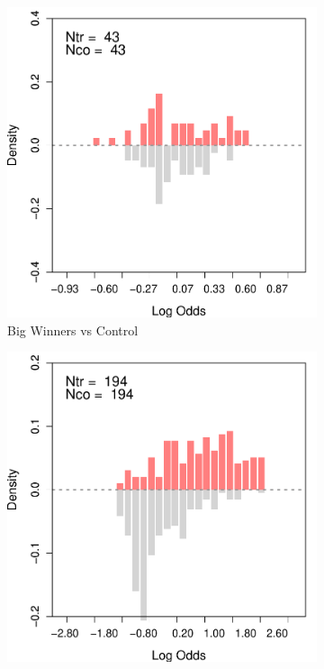 \documentclass[letterpaper,12pt,leqno]{article}
\begin{document}
\begin{figure}[!ht]
    \caption{Assessing Overlaps on Trimmed IRS Data}\label{fig:irs.overlap2}
    \centering
    \begin{minipage}[c]{.8\linewidth}
        \centering
        \hspace{-2em}\begin{subfigure}{0.45\linewidth}
            \includegraphics[width=\linewidth]{irs1_odds_trim.pdf}
            \caption{Big Winners vs Control}
        \end{subfigure}\hspace{1em}
        \begin{subfigure}{0.45\linewidth}
            \includegraphics[width=\linewidth]{irs2_odds_trim.pdf}

\end{subfigure}
\end{minipage}
\end{figure}
\end{document}
